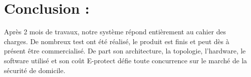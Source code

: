 \chapter{Conclusion :} 

Après 2 mois de travaux, notre système répond entièrement au cahier des charges. De nombreux test ont été réalisé, le produit est finis et peut dès à présent être commercialisé. De part son architecture, la topologie, l’hardware, le software utilisé et son coût E-protect défie toute concurrence sur le marché de la sécurité de domicile.